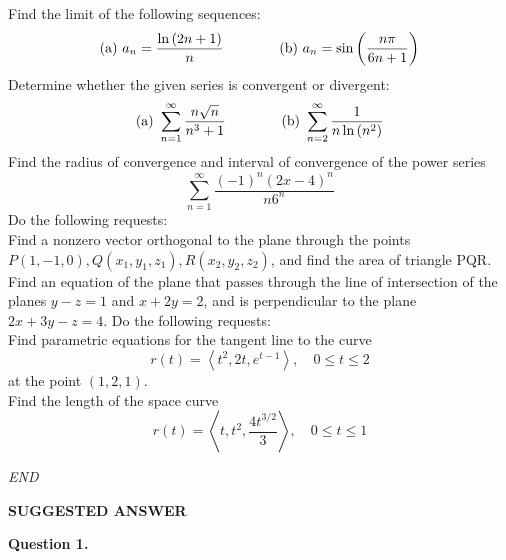 \documentclass[a4paper]{exam}
\newcommand{\myquad}[1][1]{\hspace*{#1em}\ignorespaces}
\begin{document}
	\vspace*{1mm}
	\begin{questions}
		\question Find the limit of the following sequences:
			\begin{equation*}
				\text{(a) } a_{n} = \frac{\ln{(2n + 1)}}{n}
				\myquad[4]
				\text{(b) } a_{n} = \sin{\left(\frac{n\pi}{6n + 1}\right)} 
			\end{equation*}
		\question Determine whether the given series is convergent or divergent:
			\begin{equation*}
				\text{(a) } \sum_{n = 1}^{\infty} \frac{n\sqrt{n}}{n^{3} + 1}
				\myquad[4] 
				\text{(b) } \sum_{n = 2}^{\infty} \frac{1}{n\ln{(n^{2})}}
			\end{equation*}
		\question Find the radius of convergence and interval of convergence of the power series
			\begin{equation*}
				\sum_{n = 1}^{\infty} \frac{(-1)^{n}(2x - 4)^{n}}{n6^{n}}
			\end{equation*}
		\question Do the following requests:\\[1ex]
			\noindent {} Find a nonzero vector orthogonal to the plane through the points $P(1, -1, 0), Q(x_1, y_1, z_1), R(x_2, y_2, z_2)$, and find the area of triangle PQR. \\[1ex]
		 	\noindent {} Find an equation of the plane that passes through the line of intersection of the planes $y - z = 1$ and $x + 2y = 2$, and is perpendicular to the plane $2x + 3y - z = 4$.
		\question Do the following requests:\\[1ex]
			\noindent {} Find parametric equations for the tangent line to the curve
				$$ r(t) = \left\langle t^{2}, 2t, e^{t - 1} \right\rangle, \quad 0 \leq t \leq 2$$
			at the point $(1, 2, 1)$. \\[1ex]
			\noindent {} Find the length of the space curve 
				$$ r(t) = \left\langle t, t^2, \frac{4t^{3/2}}{3} \right\rangle, \quad 0 \leq t \leq 1 $$
	\end{questions}
	\vspace*{2mm}
	\begin{center}
		\textit{\large{END}}
	\end{center}
	
	\newpage
	
	\begin{center}
		\textbf{SUGGESTED ANSWER}
	\end{center}
	
	\noindent \textbf{Question 1.}\\ 
	
\end{document}
